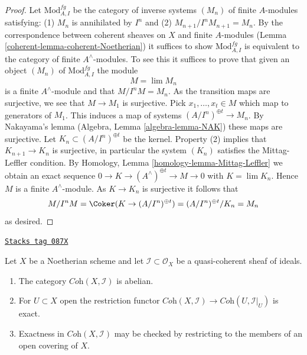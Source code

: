 \begin{proof}

Let $\text{Mod}^{fg}_{A, I}$ be the category of inverse systems $(M_n)$
of finite $A$-modules satisfying: (1) $M_n$ is annihilated by $I^n$ and (2)
$M_{n + 1}/I^nM_{n + 1} = M_n$. By the correspondence between coherent
sheaves on $X$ and finite $A$-modules (Lemma \ref{coherent-lemma-coherent-Noetherian})
it suffices to show $\text{Mod}^{fg}_{A, I}$ is equivalent to the category of
finite $A^\wedge$-modules. To see this it suffices to prove that given
an object $(M_n)$ of $\text{Mod}^{fg}_{A, I}$ the module
$$
M = \lim M_n
$$
is a finite $A^\wedge$-module and that $M/I^nM = M_n$. As the transition
maps are surjective, we see that $M \to M_1$ is surjective.
Pick $x_1, \ldots, x_t \in M$ which map to generators of $M_1$.
This induces a map of systems $(A/I^n)^{\oplus t} \to M_n$.
By Nakayama's lemma (Algebra, Lemma \ref{algebra-lemma-NAK}) these maps are
surjective. Let $K_n \subset (A/I^n)^{\oplus t}$ be the kernel.
Property (2) implies that $K_{n + 1} \to K_n$ is surjective, in particular
the system $(K_n)$ satisfies the Mittag-Leffler condition.
By Homology, Lemma \ref{homology-lemma-Mittag-Leffler}
we obtain an exact sequence
$0 \to K \to (A^\wedge)^{\oplus t} \to M \to 0$
with $K = \lim K_n$.
Hence $M$ is a finite $A^\wedge$-module.
As $K \to K_n$ is surjective it follows that
$$
M/I^nM = \Coker(K \to (A/I^n)^{\oplus t}) =
(A/I^n)^{\oplus t}/K_n = M_n
$$
as desired.
\end{proof}

\begin{lemma}
\label{coherent-lemma-inverse-systems-abelian}
\href{https://stacks.math.columbia.edu/tag/087X}{\texttt{Stacks tag 087X}}

Let $X$ be a Noetherian scheme and let $\mathcal{I} \subset \mathcal{O}_X$
be a quasi-coherent sheaf of ideals.
\begin{enumerate}
\item The category $\textit{Coh}(X, \mathcal{I})$ is abelian.
\item For $U \subset X$ open the restriction functor
$\textit{Coh}(X, \mathcal{I}) \to \textit{Coh}(U, \mathcal{I}|_U)$
is exact.
\item Exactness in $\textit{Coh}(X, \mathcal{I})$ may be checked by
restricting to the members of an open covering of $X$.
\end{enumerate}
\end{lemma}

